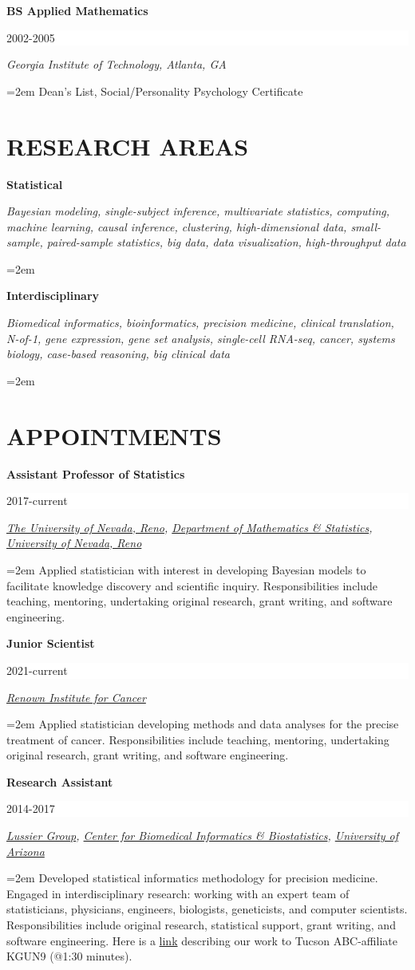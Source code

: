 \documentclass[paper=a4,fontsize=11pt]{scrartcl} %
\newcommand{\sepspace}{\vspace*{1em}}		%
\newcommand{\NewPart}[2]{\section*{\uppercase{#1} #2 }}
\newcommand{\EducationEntry}[4]{
		\noindent \textbf{#1} \hfill      %
		\colorbox{White}{%
			\parbox{6em}{%
			\hfill\color{Black}#2}} \par  %
		\noindent \textit{#3} \par        %
		\noindent\hangindent=2em\hangafter=0 \small #4 %
		\normalsize \par \vspace{-7pt}}
\begin{document}
\EducationEntry{BS Applied Mathematics}{2002-2005}{Georgia Institute of Technology, Atlanta, GA}{Dean's List, Social/Personality Psychology Certificate}

\NewPart{Research areas}{}
\vspace{-7pt}

\EducationEntry{Statistical}{}{Bayesian modeling, single-subject inference, multivariate statistics, computing, machine learning, causal inference, clustering, high-dimensional data, small-sample, paired-sample statistics, big data, data visualization, high-throughput data}{}

\EducationEntry{Interdisciplinary}{}{Biomedical informatics, bioinformatics, precision medicine, clinical translation, N-of-1, gene expression, gene set analysis, single-cell RNA-seq, cancer, systems biology, case-based reasoning, big clinical data}{}

\NewPart{Appointments}{}
\vspace{-7pt}

\EducationEntry{Assistant Professor of Statistics}{2017-current}{{\href{https://www.unr.edu/}{The University of Nevada, Reno}}, {\href{https://www.unr.edu/math/}{Department of Mathematics \& Statistics}}, {\href{http://www.unr.edu/}{University of Nevada, Reno}}}{Applied statistician with interest in developing Bayesian models to facilitate knowledge discovery and scientific inquiry. Responsibilities include teaching, mentoring, undertaking original research, grant writing, and software engineering.}
\sepspace

\EducationEntry{Junior Scientist}{2021-current}{{\href{https://www.renown.org/explore/institute-for-cancer/}{Renown Institute for Cancer}}}{Applied statistician developing methods and data analyses for the precise treatment of cancer. Responsibilities include teaching, mentoring, undertaking original research, grant writing, and software engineering.}
\sepspace

\EducationEntry{Research Assistant}{2014-2017}{{\href{http://lussierlab.org/}{Lussier Group}}, {\href{http://cb2.uahs.arizona.edu/}{Center for Biomedical Informatics \& Biostatistics}}, {\href{http://www.arizona.edu/}{University of Arizona}}}{Developed statistical informatics methodology for precision medicine. Engaged in interdisciplinary research: working with an expert team of statisticians, physicians, engineers, biologists, geneticists, and computer scientists. Responsibilities include original research, statistical support, grant writing, and software engineering. Here is a \href{http://cb2.uahs.arizona.edu/news/dr-lussier-and-grant-schissler-speak-big-data-kgun9-local-news}{link} describing our work to Tucson ABC-affiliate KGUN9 (@1:30 minutes).}
\sepspace
\end{document}
